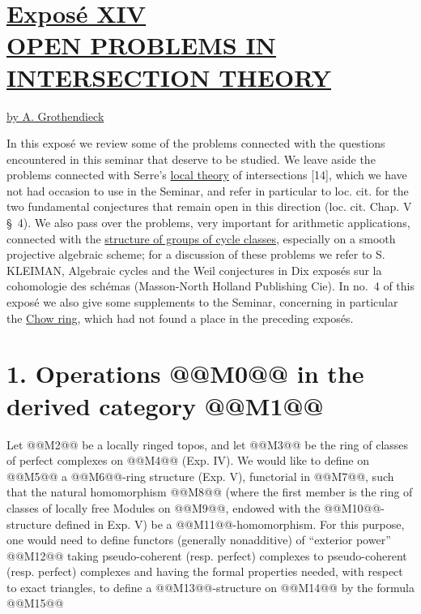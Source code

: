 \section*{\underline{Exposé XIV}\\[3pt] \underline{\underline{OPEN PROBLEMS IN INTERSECTION THEORY}}}
\begin{center}
\underline{by A. Grothendieck}
\end{center}

In this exposé we review some of the problems connected with the questions encountered in this seminar that deserve to be studied. We leave aside the problems connected with Serre's \uline{local theory} of intersections [14], which we have not had occasion to use in the Seminar, and refer in particular to loc. cit. for the two fundamental conjectures that remain open in this direction (loc. cit. Chap. V \S~4). We also pass over the problems, very important for arithmetic applications, connected with the \uline{structure of groups of cycle classes}, especially on a smooth projective algebraic scheme; for a discussion of these problems we refer to S. KLEIMAN, Algebraic cycles and the Weil conjectures in Dix exposés sur la cohomologie des schémas (Masson-North Holland Publishing Cie). In no.~4 of this exposé we also give some supplements to the Seminar, concerning in particular the \uline{Chow ring}, which had not found a place in the preceding exposés.

\section*{1. Operations @@M0@@ in the derived category @@M1@@\SGAAuthorFootMark{*}}

Let @@M2@@ be a locally ringed topos, and let @@M3@@ be the ring of classes of perfect complexes on @@M4@@ (Exp. IV). We would like to define on @@M5@@ a @@M6@@-ring structure (Exp. V), functorial in @@M7@@, such that the natural homomorphism
@@M8@@
(where the first member is the ring of classes of locally free Modules on @@M9@@, endowed with the @@M10@@-structure defined in Exp. V) be a @@M11@@-homomorphism. For this purpose, one would need to define functors (generally nonadditive) of ``exterior power''
@@M12@@
taking pseudo-coherent (resp. perfect) complexes to pseudo-coherent (resp. perfect) complexes and having the formal properties needed, with respect to exact triangles, to define a @@M13@@-structure on @@M14@@ by the formula
@@M15@@

